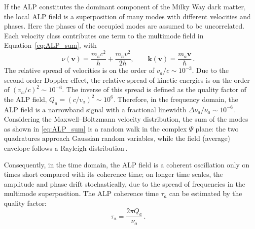 If the ALP constitutes the dominant component of the Milky Way dark matter, the local ALP field is a superposition of many modes with different velocities and phases. 
Here the phases of the occupied modes are assumed to be uncorrelated.
Each velocity class contributes one term to the multimode field in Equation~\eqref{eq:ALP_sum}, with
\begin{equation}
    \nu(\mathbf{v})
    =\frac{m_a c^2}{h}+\frac{m_a v^2}{2h},
    \qquad
    \mathbf{k}(\mathbf{v})=\frac{m_a\mathbf{v}}{\hbar}
    \,.
\end{equation}
The relative spread of velocities is on the order of $v_a/c \sim 10^{-3}$.
Due to the second-order Doppler effect, the relative spread of kinetic energies is on the order of $(v_a/c)^2 \sim 10^{-6}$. 
The inverse of this spread is defined as the quality factor of the ALP field, $Q_a =(c/v_a)^2 \sim 10^6$.
Therefore, in the frequency domain, the ALP field is a narrowband signal with a fractional linewidth $\Delta\nu_a/\nu_a \sim 10^{-6}$. 
Considering the Maxwell--Boltzmann velocity distribution, the sum of the modes as shown in \eqref{eq:ALP_sum} is a random walk in the complex $\Psi$ plane: the two quadratures approach Gaussian random variables, while the field (average) envelope follows a Rayleigh distribution\,\cite{Centers2021Stochastic,Gramolin2022Feb_SpectralSignatures}. 

Consequently, in the time domain, the ALP field is a coherent oscillation only on times short compared with its coherence time; on longer time scales, the amplitude and phase drift stochastically, due to the spread of frequencies in the multimode superposition. 
The ALP coherence time $\tau_a$ can be estimated by the quality factor:
\begin{equation}
    \tau_a = \frac{2\pi Q_a}{\nu_a}
    \,.
    \label{eq:taua_Qa_nua}
\end{equation}


